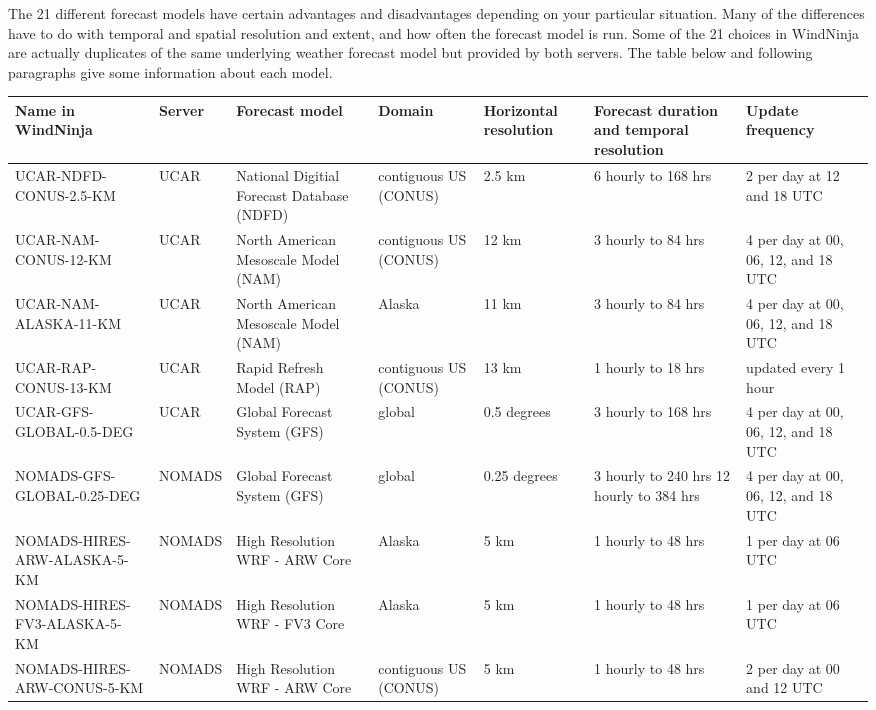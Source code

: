 \documentclass[12pt]{article}
\begin{document}
The 21 different forecast models have certain advantages and disadvantages depending on your particular situation.  Many of the differences have to do with temporal and spatial resolution and extent, and how often the forecast model is run.  Some of the 21 choices in WindNinja are actually duplicates of the same underlying weather forecast model but provided by both servers.  The table below and following paragraphs give some information about each model.

\begin{landscape}
\begin{table}
\fontsize{8}{12}\selectfont 
\begin{tabular}{|p{6.6cm}|p{1.3cm}|p{3.3cm}|p{2cm}|p{1.7cm}|p{2.8cm}|p{2.8cm}|}
\hline
\rowcolor{lightgray} Name in WindNinja & Server & Forecast model & Domain & Horizontal resolution & Forecast duration and temporal resolution & Update frequency\\
\hline
UCAR-NDFD-CONUS-2.5-KM & UCAR & National Digitial Forecast Database (NDFD) & contiguous US (CONUS) & 2.5 km & 6 hourly to 168 hrs & 2 per day at 12 and 18 UTC\\
\hline
UCAR-NAM-CONUS-12-KM & UCAR & North American Mesoscale Model (NAM) & contiguous US (CONUS) & 12 km & 3 hourly to 84 hrs & 4 per day at 00, 06, 12, and 18 UTC\\
\hline
UCAR-NAM-ALASKA-11-KM & UCAR & North American Mesoscale Model (NAM) & Alaska & 11 km & 3 hourly to 84 hrs & 4 per day at 00, 06, 12, and 18 UTC\\
\hline
UCAR-RAP-CONUS-13-KM & UCAR & Rapid Refresh Model (RAP) & contiguous US (CONUS) & 13 km & 1 hourly to 18 hrs & updated every 1 hour\\
\hline
UCAR-GFS-GLOBAL-0.5-DEG & UCAR & Global Forecast System (GFS) & global & 0.5 degrees & 3 hourly to 168 hrs & 4 per day at 00, 06, 12, and 18 UTC\\
\hline
NOMADS-GFS-GLOBAL-0.25-DEG & NOMADS & Global Forecast System (GFS) & global & 0.25 degrees & 3 hourly to 240 hrs 12 hourly to 384 hrs & 4 per day at 00, 06, 12, and 18 UTC\\
\hline
NOMADS-HIRES-ARW-ALASKA-5-KM & NOMADS & High Resolution WRF - ARW Core & Alaska & 5 km & 1 hourly to 48 hrs & 1 per day at 06 UTC\\
\hline
NOMADS-HIRES-FV3-ALASKA-5-KM & NOMADS & High Resolution WRF - FV3 Core & Alaska & 5 km & 1 hourly to 48 hrs & 1 per day at 06 UTC\\
\hline
NOMADS-HIRES-ARW-CONUS-5-KM & NOMADS & High Resolution WRF - ARW Core & contiguous US (CONUS) & 5 km & 1 hourly to 48 hrs & 2 per day at 00 and 12 UTC\\

\end{tabular}
\end{table}
\end{landscape}
\end{document}
